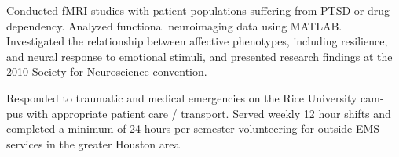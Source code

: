 \documentclass[]{deedy-resume-openfont}
\begin{document}
\begin{minipage}[t]{0.66\textwidth}
\vspace{\topsep} %
Conducted fMRI studies with patient populations suffering from PTSD or drug dependency. Analyzed functional neuroimaging data using MATLAB. Investigated the relationship between affective phenotypes, including resilience, and neural response to emotional stimuli, and presented research findings at the 2010 Society for Neuroscience convention.
\sectionsep

\vspace{\topsep} %
Responded to traumatic and medical emergencies on the Rice University cam- pus with appropriate patient care / transport. Served weekly 12 hour shifts and completed a minimum of 24 hours per semester volunteering for outside EMS services in the greater Houston area
\sectionsep

\end{minipage} 
\end{document}
